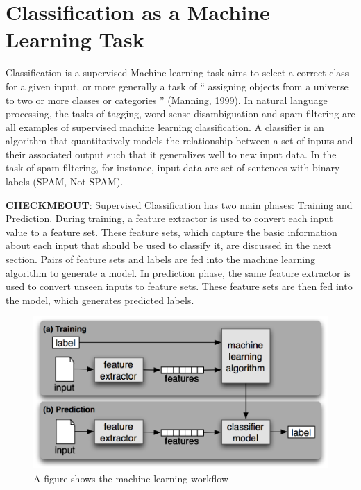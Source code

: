 \section{Classification as a Machine Learning Task}
Classification is a supervised Machine learning task aims to select a correct class for a given input, or more generally a task of “ assigning objects from a universe to two or more classes or categories ” (Manning, 1999). In natural language processing, the tasks of tagging, word sense disambiguation and spam filtering are all examples of supervised machine learning classification. A classifier is an algorithm that quantitatively models the relationship between a set of inputs and their associated output such that it generalizes well to new input data. In the task of spam filtering, for instance, input data are set of sentences with binary labels (SPAM, Not SPAM). 

\textbf{CHECKMEOUT}: Supervised Classification has two main phases: Training and Prediction. During training, a feature extractor is used to convert each input value to a feature set. These feature sets, which capture the basic information about each input that should be used to classify it, are discussed in the next section. Pairs of feature sets and labels are fed into the machine learning algorithm to generate a model. In prediction phase, the same feature extractor is used to convert unseen inputs to feature sets. These feature sets are then fed into the model, which generates predicted labels.

\begin{figure}
\includegraphics[scale=.8]{../Figures/mlpipeline.png} \centering
\caption{A figure shows the machine learning workflow}
\end{figure}

